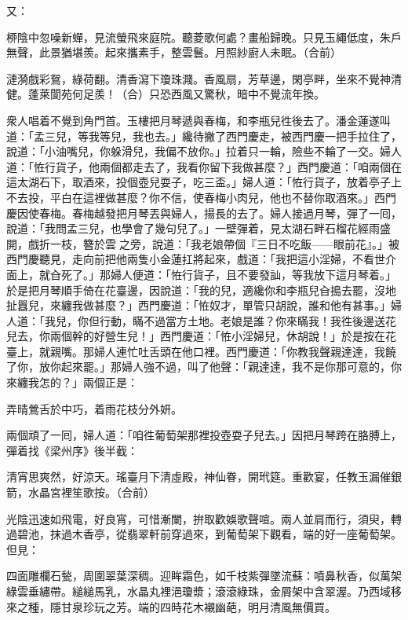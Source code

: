 又：

\begin{myquote} 
桺陰中忽噪新蟬，見流螢飛來庭院。聽菱歌何處？畫船歸晚。只見玉繩低度，朱戶無聲，此景猶堪羨。起來攜素手，整雲鬟。月照紗廚人未眠。\markfont\small{（合前）}

漣漪戲彩鴛，綠荷翻。清香瀉下瓊珠濺。香風扇，芳草邊，閑亭畔，坐來不覺神清健。蓬萊閬苑何足羨！\markfont\small{（合）}只恐西風又驚秋，暗中不覺流年換。
\end{myquote} 

衆人唱着不覺到角門首。玉樓把月琴遞與春梅，和李瓶兒徃後去了。{}潘金蓮遂叫道：「孟三兒，等我等兒，我也去。」纔待撇了西門慶走，被西門慶一把手拉住了，說道：「小油嘴兒，你躲滑兒，我偏不放你。」拉着只一輪，險些不輪了一交。{}婦人道：「恠行貨子，他兩個都走去了，我看你留下我做甚麼？」西門慶道：「咱兩個在這太湖石下，取酒來，投個壺兒耍子，吃三盃。」婦人道：「恠行貨子，放着亭子上不去投，平白在這裡做甚麼？你不信，使春梅小肉兒，他也不替你取酒來。」西門慶因使春梅。春梅越發把月琴丟與婦人，揚長的去了。{}婦人接過月琴，彈了一囘，說道：「我問孟三兒，也學會了幾句兒了。」一壁彈着，見太湖石畔石榴花經雨盛開，戲折一枝，簪於雲𩬆之旁，{}說道：「我老娘帶個『三日不吃飯——眼前花』。」{}被西門慶聽見，走向前把他兩隻小金蓮扛將起來，戲道：「我把這小淫婦，不看世介面上，就㒲死了。」{}那婦人便道：「恠行貨子，且不要發訕，等我放下這月琴着。」{}於是把月琴順手倚在花臺邊，因說道：「我的兒，適纔你和李瓶兒㒲搗去罷，沒地扯囂兒，來纏我做甚麼？」西門慶道：「恠奴才，單管只胡說，誰和他有甚事。」婦人道：「我兒，你但行動，瞞不過當方土地。老娘是誰？你來瞞我！我徃後邊送花兒去，你兩個幹的好營生兒！」西門慶道：「恠小淫婦兒，休胡說！」於是按在花臺上，就親嘴。那婦人連忙吐舌頭在他口裡。西門慶道：「你教我聲親達達，我饒了你，放你起來罷。」那婦人強不過，叫了他聲：「親達達，我不是你那可意的，你來纏我怎的？」{}兩個正是：

\begin{myquote} 
弄晴鶯舌於中巧，着雨花枝分外妍。
\end{myquote} 

兩個頑了一囘，婦人道：「咱徃葡萄架那裡投壺耍子兒去。」因把月琴跨在胳膊上，{}彈着找《梁州序》後半截：{}

\begin{myquote}
清宵思爽然，好涼天。瑤臺月下清虛殿，神仙眷，開玳筵。重歡宴，任教玉漏催銀箭，水晶宮裡笙歌按。\markfont\small{（合前）}

光陰迅速如飛電，好良宵，可惜漸闌，拚取歡娛歌聲喧。兩人並肩而行，須臾，轉過碧池，抹過木香亭，從翡翠軒前穿過來，到葡萄架下觀看，端的好一座葡萄架。但見：

四面雕欄石甃，周圍翠葉深稠。迎眸霜色，如千枝紫彈墜流蘇：噴鼻秋香，似萬架綠雲垂繡帶。縋縋馬乳，水晶丸裡浥瓊漿；滾滾綠珠，金屑架中含翠渥。乃西域移來之種，隱甘泉珍玩之芳。端的四時花木襯幽葩，明月清風無價買。
\end{myquote}

